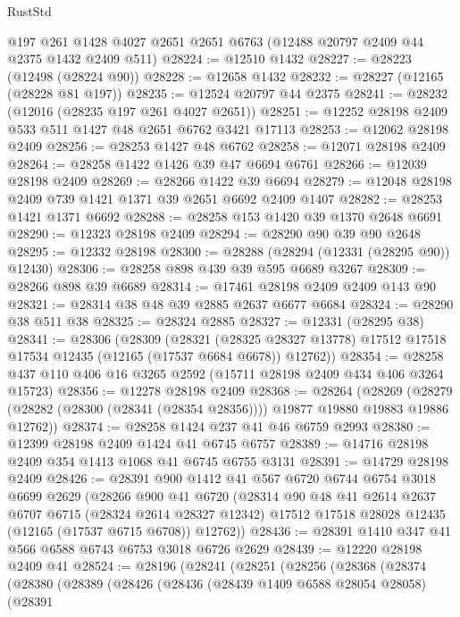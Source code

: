 \begin{lexlean}{RustStd}
\begin{coremodule}
    @197
    @261
    @1428
    @4027
    @2651
    @2651
    @6763
    (@12488 @20797 @2409 @44 @2375 @1432 @2409 @511)
@28224 := @12510 @1432
@28227 := @28223 (@12498 (@28224 @90))
@28228 := @12658 @1432
@28232 := @28227 (@12165 (@28228 @81 @197))
@28235 := @12524 @20797 @44 @2375
@28241 := @28232 (@12016 (@28235 @197 @261 @4027 @2651))
@28251 := @12252 @28198 @2409 @533 @511 @1427 @48 @2651 @6762 @3421 @17113
@28253 := @12062 @28198 @2409
@28256 := @28253 @1427 @48 @6762
@28258 := @12071 @28198 @2409
@28264 := @28258 @1422 @1426 @39 @47 @6694 @6761
@28266 := @12039 @28198 @2409
@28269 := @28266 @1422 @39 @6694
@28279 := @12048 @28198 @2409 @739 @1421 @1371 @39 @2651 @6692 @2409 @1407
@28282 := @28253 @1421 @1371 @6692
@28288 := @28258 @153 @1420 @39 @1370 @2648 @6691
@28290 := @12323 @28198 @2409
@28294 := @28290 @90 @39 @90 @2648
@28295 := @12332 @28198
@28300 := @28288 (@28294 (@12331 (@28295 @90)) @12430)
@28306 := @28258 @898 @439 @39 @595 @6689 @3267
@28309 := @28266 @898 @39 @6689
@28314 := @17461 @28198 @2409 @2409 @143 @90
@28321 := @28314 @38 @48 @39 @2885 @2637 @6677 @6684
@28324 := @28290 @38 @511 @38
@28325 := @28324 @2885
@28327 := @12331 (@28295 @38)
@28341 := @28306
    (@28309
      (@28321
        (@28325 @28327 @13778)
        @17512
        @17518
        @17534
        @12435
        (@12165 (@17537 @6684 @6678))
        @12762))
@28354 := @28258 @437 @110 @406 @16 @3265 @2592 (@15711 @28198 @2409 @434 @406 @3264 @15723)
@28356 := @12278 @28198 @2409
@28368 := @28264
    (@28269 (@28279 (@28282 (@28300 (@28341 (@28354 @28356)))) @19877 @19880 @19883 @19886 @12762))
@28374 := @28258 @1424 @237 @41 @46 @6759 @2993
@28380 := @12399 @28198 @2409 @1424 @41 @6745 @6757
@28389 := @14716 @28198 @2409 @354 @1413 @1068 @41 @6745 @6755 @3131
@28391 := @14729 @28198 @2409
@28426 := @28391
    @900
    @1412
    @41
    @567
    @6720
    @6744
    @6754
    @3018
    @6699
    @2629
    (@28266
      @900
      @41
      @6720
      (@28314
        @90
        @48
        @41
        @2614
        @2637
        @6707
        @6715
        (@28324 @2614 @28327 @12342)
        @17512
        @17518
        @28028
        @12435
        (@12165 (@17537 @6715 @6708))
        @12762))
@28436 := @28391 @1410 @347 @41 @566 @6588 @6743 @6753 @3018 @6726 @2629
@28439 := @12220 @28198 @2409 @41
@28524 := @28196
    (@28241
      (@28251
        (@28256
          (@28368
            (@28374
              (@28380
                (@28389
                  (@28426
                    (@28436
                      (@28439 @1409 @6588 @28054 @28058)
                      (@28391

\end{coremodule}
\end{lexlean}
